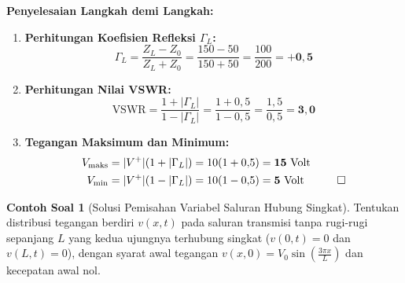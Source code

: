 \documentclass[11pt,a4paper]{article}
\theoremstyle{definition}
\newtheorem{example}{Contoh Soal}[section]
\begin{document}
\noindent\textbf{Penyelesaian Langkah demi Langkah:}
\begin{enumerate}[leftmargin=*]
    \item \textbf{Perhitungan Koefisien Refleksi $\Gamma_L$:}
    \begin{equation*}
        \Gamma_L = \frac{Z_L - Z_0}{Z_L + Z_0} = \frac{150 - 50}{150 + 50} = \frac{100}{200} = \mathbf{+0{,}5}
    \end{equation*}
    
    \item \textbf{Perhitungan Nilai VSWR:}
    \begin{equation*}
        \text{VSWR} = \frac{1 + |\Gamma_L|}{1 - |\Gamma_L|} = \frac{1 + 0{,}5}{1 - 0{,}5} = \frac{1{,}5}{0{,}5} = \mathbf{3{,}0}
    \end{equation*}
    
    \item \textbf{Tegangan Maksimum dan Minimum:}
    \begin{align*}
        V_{\text{maks}} &= |V^+| (1 + |\Gamma_L|) = 10(1 + 0{,}5) = \mathbf{15\text{ Volt}} \\
        V_{\text{min}}  &= |V^+| (1 - |\Gamma_L|) = 10(1 - 0{,}5) = \mathbf{5\text{ Volt}} \quad \qed
    \end{align*}
\end{enumerate}

\begin{example}[Solusi Pemisahan Variabel Saluran Hubung Singkat]
Tentukan distribusi tegangan berdiri $v(x, t)$ pada saluran transmisi tanpa rugi-rugi sepanjang $L$ yang kedua ujungnya terhubung singkat ($v(0, t) = 0$ dan $v(L, t) = 0$), dengan syarat awal tegangan $v(x, 0) = V_0 \sin\left(\frac{3\pi x}{L}\right)$ dan kecepatan awal nol.
\end{example}
\end{document}
